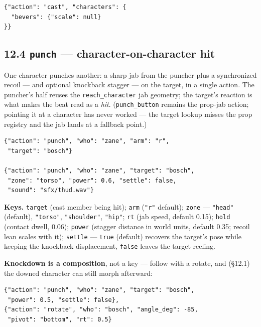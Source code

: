 \documentclass[
  11pt,
]{book}
\begin{document}
\begin{verbatim}
{"action": "cast", "characters": {
  "bevers": {"scale": null}
}}
\end{verbatim}

\subsection{\texorpdfstring{12.4 \texttt{punch} --- character-on-character
hit}{12.4 punch --- character-on-character hit}}\label{punch-action}

One character punches another: a sharp jab from the puncher plus a
synchronized recoil --- and optional knockback stagger --- on the
target, in a single action. The puncher's half reuses the
\texttt{reach\_character} jab geometry; the target's reaction is what
makes the beat read as a \emph{hit}. (\texttt{punch\_button} remains
the prop-jab action; pointing it at a character has never worked ---
the target lookup misses the prop registry and the jab lands at a
fallback point.)

\begin{verbatim}
{"action": "punch", "who": "zane", "arm": "r",
 "target": "bosch"}

{"action": "punch", "who": "zane", "target": "bosch",
 "zone": "torso", "power": 0.6, "settle": false,
 "sound": "sfx/thud.wav"}
\end{verbatim}

\textbf{Keys.} \texttt{target} (cast member being hit);
\texttt{arm} (\texttt{"r"} default); \texttt{zone} ---
\texttt{"head"} (default), \texttt{"torso"}, \texttt{"shoulder"},
\texttt{"hip"}; \texttt{rt} (jab speed, default 0.15);
\texttt{hold} (contact dwell, 0.06); \texttt{power} (stagger
distance in world units, default 0.35; recoil lean scales with it);
\texttt{settle} --- \texttt{true} (default) recovers the target's
pose while keeping the knockback displacement, \texttt{false} leaves
the target reeling.

\textbf{Knockdown is a composition}, not a key --- follow with a
rotate, and (§12.1) the downed character can still morph afterward:

\begin{verbatim}
{"action": "punch", "who": "zane", "target": "bosch",
 "power": 0.5, "settle": false},
{"action": "rotate", "who": "bosch", "angle_deg": -85,
 "pivot": "bottom", "rt": 0.5}
\end{verbatim}
\end{document}
